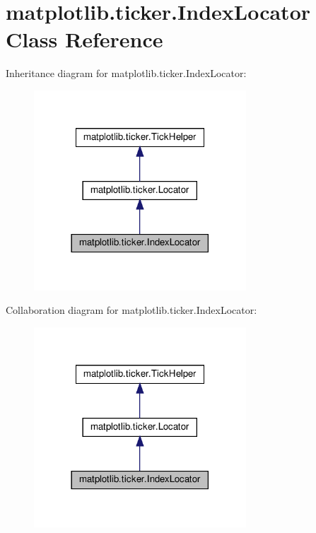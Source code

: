 \hypertarget{classmatplotlib_1_1ticker_1_1IndexLocator}{}\section{matplotlib.\+ticker.\+Index\+Locator Class Reference}
\label{classmatplotlib_1_1ticker_1_1IndexLocator}


Inheritance diagram for matplotlib.\+ticker.\+Index\+Locator\+:
\nopagebreak
\begin{figure}[H]
\begin{center}
\leavevmode
\includegraphics[width=225pt]{classmatplotlib_1_1ticker_1_1IndexLocator__inherit__graph}
\end{center}
\end{figure}


Collaboration diagram for matplotlib.\+ticker.\+Index\+Locator\+:
\nopagebreak
\begin{figure}[H]
\begin{center}
\leavevmode
\includegraphics[width=225pt]{classmatplotlib_1_1ticker_1_1IndexLocator__coll__graph}
\end{center}
\end{figure}
